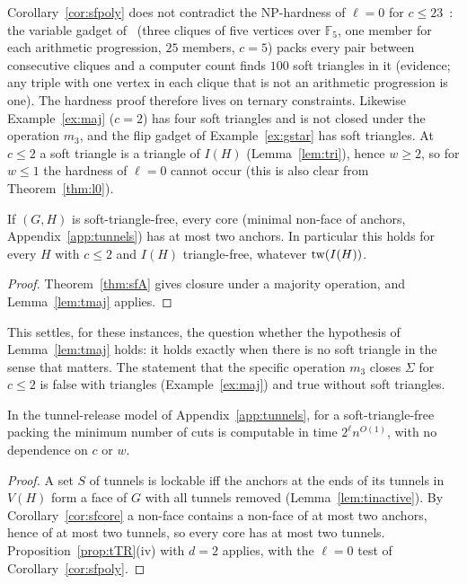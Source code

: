 \begin{remark}[No conflict with the hardness of $\ell=0$]\label{rem:sfLPS}
Corollary~\ref{cor:sfpoly} does not contradict the NP-hardness of $\ell=0$ for $c\le23$~\cite{LPS23}: the variable gadget of~\cite[Sect.~4.1.1]{LPS23} (three cliques of five vertices over $\mathbb F_5$, one member for each arithmetic progression, $25$ members, $c=5$) packs every pair between consecutive cliques and a computer count finds $100$ soft triangles in it (evidence; any triple with one vertex in each clique that is not an arithmetic progression is one). The hardness proof therefore lives on ternary constraints. Likewise Example~\ref{ex:maj} ($c=2$) has four soft triangles and is not closed under the operation $m_3$, and the flip gadget of Example~\ref{ex:gstar} has soft triangles. At $c\le2$ a soft triangle is a triangle of $I(H)$ (Lemma~\ref{lem:tri}), hence $w\ge2$, so for $w\le1$ the hardness of $\ell=0$ cannot occur (this is also clear from Theorem~\ref{thm:l0}).
\end{remark}

\begin{corollary}\label{cor:sfcore}
If $(G,H)$ is soft-triangle-free, every core (minimal non-face of anchors, Appendix~\ref{app:tunnels}) has at most two anchors. In particular this holds for every $H$ with $c\le2$ and $I(H)$ triangle-free, whatever $\mathrm{tw}(I(H))$.
\end{corollary}
\begin{proof}
Theorem~\ref{thm:sfA} gives closure under a majority operation, and Lemma~\ref{lem:tmaj} applies.
\end{proof}
This settles, for these instances, the question whether the hypothesis of Lemma~\ref{lem:tmaj} holds: it holds exactly when there is no soft triangle in the sense that matters. The statement that the specific operation $m_3$ closes $\Sigma$ for $c\le2$ is false with triangles (Example~\ref{ex:maj}) and true without soft triangles.

\begin{corollary}\label{cor:sfTR}
In the tunnel-release model of Appendix~\ref{app:tunnels}, for a soft-triangle-free packing the minimum number of cuts is computable in time $2^{\ell}n^{O(1)}$, with no dependence on $c$ or $w$.
\end{corollary}
\begin{proof}
A set $S$ of tunnels is lockable iff the anchors at the ends of its tunnels in $V(H)$ form a face of $G$ with all tunnels removed (Lemma~\ref{lem:tinactive}). By Corollary~\ref{cor:sfcore} a non-face contains a non-face of at most two anchors, hence of at most two tunnels, so every core has at most two tunnels. Proposition~\ref{prop:tTR}(iv) with $d=2$ applies, with the $\ell=0$ test of Corollary~\ref{cor:sfpoly}.
\end{proof}

